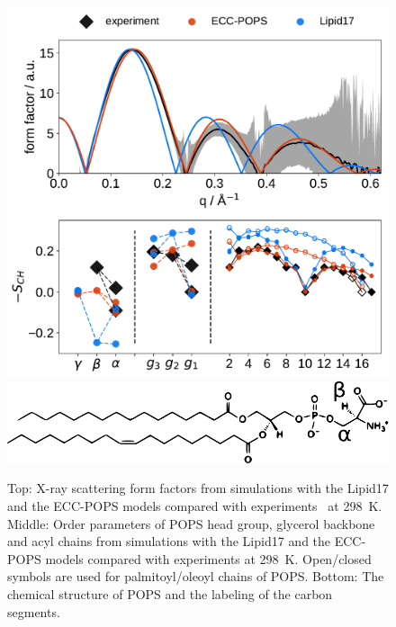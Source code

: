 \begin{figure}[tb!] 
  \centering 
  \includegraphics[width=\figwidth]{../img/ecc_pops/Order-parameters_form-factors_exp-L17-ECC-lipids.pdf}
  \includegraphics[width=\figwidth]{../img/ecc_pops/pops_chemfig.pdf} 
\hfill
  \caption{\label{simVSexpNOions_POPS} 
    Top: X-ray scattering form factors from simulations with the Lipid17 \citep{lipid17-future} and 
    the ECC-POPS models compared with experiments~\citep{kucerka14} at 298~K. 
    Middle: Order parameters of POPS head group, glycerol backbone and acyl chains  
    from simulations with the Lipid17 \citep{lipid17-future} and the ECC-POPS models 
    compared with experiments at 298~K. \citep{nmrlipids_proj4}
    Open/closed symbols are used for palmitoyl/oleoyl chains of POPS. 
    Bottom: The chemical structure of POPS and the labeling of the carbon segments. 
  }  
\end{figure} 
 
